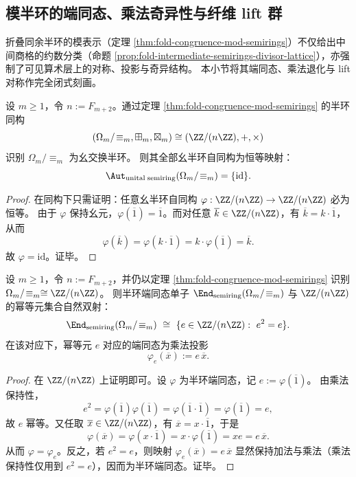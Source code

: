 \subsection{模半环的端同态、乘法奇异性与纤维 lift 群}\label{subsec:fold-mod-semirings-endomorphisms-and-lifts}
折叠同余半环的模表示（定理 \ref{thm:fold-congruence-mod-semirings}）不仅给出中间商格的约数分类（命题 \ref{prop:fold-intermediate-semirings-divisor-lattice}），亦强制了可见算术层上的对称、投影与奇异结构。
本小节将其端同态、乘法退化与 lift 对称作完全闭式刻画。

\begin{theorem}[折叠同余半环的幺自同构刚性]\label{thm:fold-mod-semirings-unital-automorphism-rigidity}
设 \(m\ge 1\)，令 \(n:=F_{m+2}\)。通过定理 \ref{thm:fold-congruence-mod-semirings} 的半环同构
\[
(\Omega_m/\!\equiv_m,\boxplus_m,\boxtimes_m)\cong (\ZZ/(n\ZZ),+,\times)
\]
识别 \(\Omega_m/\!\equiv_m\) 为幺交换半环。
则其全部幺半环自同构为恒等映射：
\[
\Aut_{\mathrm{unital\; semiring}}(\Omega_m/\!\equiv_m)=\{\mathrm{id}\}.
\]
\end{theorem}
\begin{proof}
在同构下只需证明：任意幺半环自同构 \(\varphi:\ZZ/(n\ZZ)\to \ZZ/(n\ZZ)\) 必为恒等。
由于 \(\varphi\) 保持幺元，\(\varphi(\overline 1)=\overline 1\)。而对任意 \(\overline k\in\ZZ/(n\ZZ)\)，有 \(\overline k=k\cdot \overline 1\)，从而
\[
\varphi(\overline k)=\varphi(k\cdot \overline 1)=k\cdot \varphi(\overline 1)=\overline k.
\]
故 \(\varphi=\mathrm{id}\)。证毕。
\end{proof}

\begin{theorem}[折叠同余半环的端同态与幂等元分类]\label{thm:fold-mod-semirings-endomorphisms-idempotents}
设 \(m\ge 1\)，令 \(n:=F_{m+2}\)，并仍以定理 \ref{thm:fold-congruence-mod-semirings} 识别 \(\Omega_m/\!\equiv_m\cong \ZZ/(n\ZZ)\)。
则半环端同态单子 \(\End_{\mathrm{semiring}}(\Omega_m/\!\equiv_m)\) 与 \(\ZZ/(n\ZZ)\) 的幂等元集合自然双射：
\[
\End_{\mathrm{semiring}}(\Omega_m/\!\equiv_m)\ \cong\ \{e\in \ZZ/(n\ZZ):\ e^2=e\}.
\]
在该对应下，幂等元 \(e\) 对应的端同态为乘法投影
\[
\varphi_e(\overline x):=e\,\overline x.
\]
\end{theorem}
\begin{proof}
在 \(\ZZ/(n\ZZ)\) 上证明即可。设 \(\varphi\) 为半环端同态，记 \(e:=\varphi(\overline 1)\)。
由乘法保持性，
\[
e^2=\varphi(\overline 1)\varphi(\overline 1)=\varphi(\overline 1\cdot \overline 1)=\varphi(\overline 1)=e,
\]
故 \(e\) 幂等。又任取 \(\overline x\in\ZZ/(n\ZZ)\)，有 \(\overline x=x\cdot \overline 1\)，于是
\[
\varphi(\overline x)=\varphi(x\cdot \overline 1)=x\cdot \varphi(\overline 1)=x e=e\,\overline x.
\]
从而 \(\varphi=\varphi_e\)。反之，若 \(e^2=e\)，则映射 \(\varphi_e(\overline x)=e\,\overline x\) 显然保持加法与乘法（乘法保持性仅用到 \(e^2=e\)），因而为半环端同态。证毕。
\end{proof}

